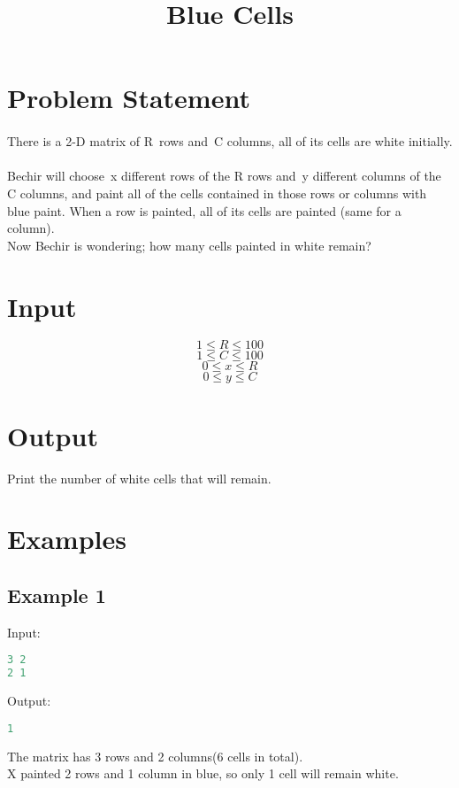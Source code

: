 \documentclass[10pt]{article}
\begin{document}
\title{Blue Cells}
 \date{}
\maketitle
\section{Problem Statement}
\paragraph{}
There is a 2-D matrix of R rows and C columns, all of its cells are white initially.
\paragraph{}
Bechir will choose x different rows of the R rows and y different columns of the C columns, and paint all of the cells contained in those rows or columns with blue paint. When a row is painted, all of its cells are painted (same for a column).\\
Now Bechir is wondering; how many cells painted in white remain?
\section{Input}
$$ 1\le R \le 100 $$
$$ 1\le C \le 100 $$
$$ 0\le x \le R $$
$$ 0\le y \le C $$
\section{Output}
Print the number of white cells that will remain.
\section{Examples}
\subsection{Example 1}
Input:
\begin{lstlisting}[language=Python]
3 2
2 1
\end{lstlisting}
Output:
\begin{lstlisting}[language=Python]
1
\end{lstlisting}
The matrix has 3 rows and 2 columns(6 cells in total).\\
X painted 2 rows and 1 column in blue, so only 1 cell will remain white.
\end{document}

